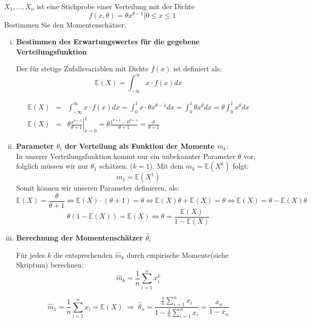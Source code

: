 \begin{uebsp}
\begin{Exercise}[label=ex:7.6]
$X_1,...,X_n$ ist eine Stichprobe einer Verteilung mit der Dichte
\[f(x,\theta)=\theta x^{\theta-1}[0\leq x\leq 1\]
Bestimmen Sie den Momentenschätzer.
\end{Exercise}
\begin{Answer}

\begin{enumerate}[i)]
    \item \textbf{Bestimmen des Erwartungswertes für die gegebene Verteilungsfunktion}
        \begin{uebsp_theory}
            Der  für stetige Zufallsvariablen mit Dichte $f(x)$ ist definiert als:
            \[\mathbb{E}(X)=\int_{-\infty}^{\infty}x\cdot f(x)dx\]
        \end{uebsp_theory}
    \begin{eqnarray*}\mathbb{E}(X)&=&\int_{-\infty}^{\infty}x\cdot f(x)dx=\int_{0}^{1}x\cdot \theta x^{\theta-1}dx=\int_{0}^{1}\theta x^{\theta}dx=\theta\int_{0}^{1} x^{\theta}dx\\
        \mathbb{E}(X)&=&\left.\theta\frac{x^{\theta+1}}{\theta+1}\right|_{x=0}^1=\theta\frac{1^{\theta+1}-0^{\theta+1}}{\theta+1}=\frac{\theta}{\theta+1}
    \end{eqnarray*}
    \item \textbf{Parameter $\theta_i$ der Verteilung als Funktion der Momente $m_k$}:\\
        In unserer Verteilungsfunktion kommt nur ein unbekannter Parameter $\theta$ vor, folglich müssen wir nur $\theta_1$ schätzen. ($k=1$).
        Mit dem  $m_k=\mathbb{E}(X^k)$ folgt:
        \[m_1=\mathbb{E}(X^1)\]
        Somit können wir unseren Parameter definieren, als:
        \[\mathbb{E}(X)=\frac{\theta}{\theta+1}\Leftrightarrow\mathbb{E}(X)\cdot (\theta+1)=\theta\Leftrightarrow\mathbb{E}(X)\theta+\mathbb{E}(X)=\theta\Leftrightarrow\mathbb{E}(X)=\theta-\mathbb{E}(X)\theta\]
        \[\theta(1-\mathbb{E}(X))=\mathbb{E}(X)\Leftrightarrow\theta=\frac{\mathbb{E}(X)}{1-\mathbb{E}(X)}\]
    \item \textbf{Berechnung der Momentenschätzer $\hat\theta_i$ }
    \begin{uebsp_theory}
        Für jedes $k$ die entsprechenden $\hat m_k$ durch empirische Momente(siehe Skriptum) berechnen:
        \[\hat m_k=\frac{1}{n}\sum_{i=1}^n x_i^k\]
    \end{uebsp_theory}
    \[\hat m_1=\frac{1}{n}\sum_{i=1}^n x_i=\mathbb{E}(X)\;\Rightarrow\;\hat\theta_n=\frac{\frac{1}{n}\sum_{i=1}^n x_i}{1-\frac{1}{n}\sum_{i=1}^n x_i}=\frac{\overline x_n}{1-\overline x_n}\]
    
\end{enumerate}
\end{Answer}
\end{uebsp}
